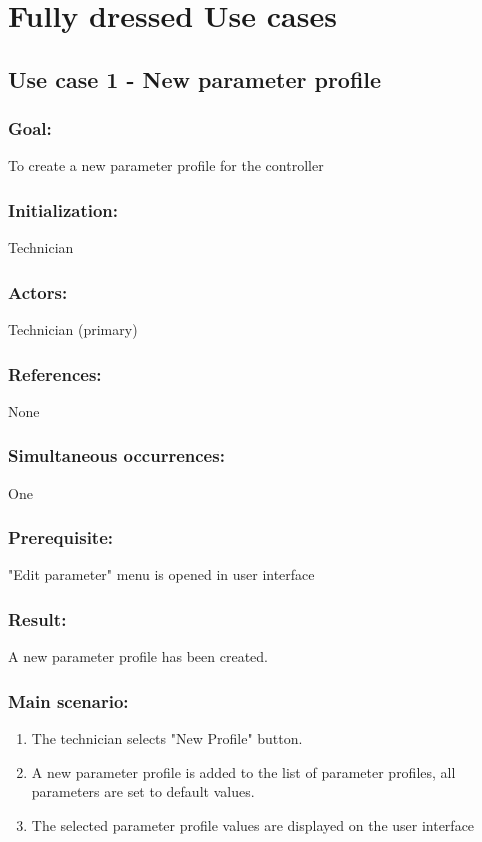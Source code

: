 \pagebreak

\section{Fully dressed Use cases }


\begin{framed}
\subsection{Use case 1 - New parameter profile}
\subsubsection*{Goal:}
To create a new parameter profile for the controller

\subsubsection*{Initialization:}
Technician

\subsubsection*{Actors:}
Technician (primary)

\subsubsection*{References:}
None

\subsubsection*{Simultaneous occurrences:}
One

\subsubsection*{Prerequisite:}
"Edit parameter" menu is opened in user interface

\subsubsection*{Result:}
A new parameter profile has been created.

\subsubsection*{Main scenario:}
\begin{enumerate}
	\item The technician selects "New Profile" button.
	\item A new parameter profile is added to the list of parameter profiles, all parameters are set to default values.
	\item The selected parameter profile values are displayed on the user interface
\end{enumerate}	
\end{framed}

